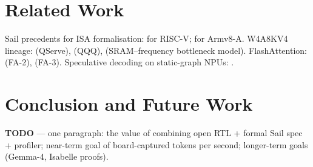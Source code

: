 \documentclass[11pt,a4paper]{article}
\begin{document}
\section{Related Work}
\label{sec:related}

Sail precedents for ISA formalisation: \cite{armstrong2019isa} for
RISC-V; \cite{sailarm2020} for Armv8-A.  W4A8KV4 lineage:
\cite{qserve2024} (QServe), \cite{qqq2024} (QQQ), \cite{sramfreq2025}
(SRAM--frequency bottleneck model).  FlashAttention:
\cite{dao2023flash2} (FA-2), \cite{dao2024flash3} (FA-3).
Speculative decoding on static-graph NPUs: \cite{openpangu2026}.

\section{Conclusion and Future Work}
\label{sec:conclusion}

\textbf{TODO} — one paragraph: the value of combining open RTL +
formal Sail spec + profiler; near-term goal of board-captured
tokens per second; longer-term goals (Gemma-4, Isabelle proofs).



\end{document}
